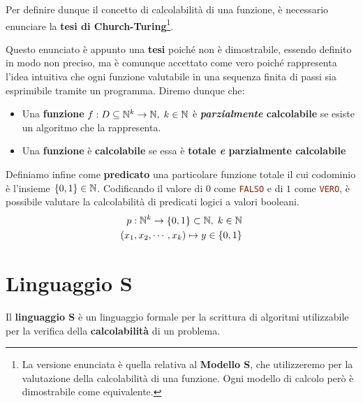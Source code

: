Per definire dunque il concetto di calcolabilità di una funzione, è necessario enunciare la \textbf{tesi di Church-Turing}\footnote{La versione enunciata è quella relativa al \textbf{Modello S}, che utilizzeremo per la valutazione della calcolabilità di una funzione. Ogni modello di calcolo però è dimostrabile come equivalente.}.

Questo enunciato è appunto una \textbf{tesi} poiché non è dimostrabile, essendo definito in modo non preciso, ma è comunque accettato come vero poiché rappresenta l'idea intuitiva che ogni funzione valutabile in una sequenza finita di passi sia esprimibile tramite un programma.
Diremo dunque che:

\begin{itemize}
  \item Una \textbf{funzione} \(f: D\subseteq\mathbb{N}^k\rightarrow\mathbb{N},\; k\in\mathbb{N}\) è \textbf{\textit{parzialmente} calcolabile} se esiste un algoritmo che la rappresenta.
  \item Una \textbf{funzione} è \textbf{calcolabile} se essa è \textbf{totale \textit{e} parzialmente calcolabile}
\end{itemize}

Definiamo infine come \textbf{predicato} una particolare funzione totale il cui codominio è l'insieme \(\displaystyle{\left\{{0,1}\right\}}\in\mathbb{N}\). Codificando il valore di \(0\) come \lstinline[language=ini]{FALSO} e di \(1\) come \lstinline[language=ini]{VERO}, è possibile valutare la calcolabilità di predicati logici a valori booleani.
\begin{equation}
  \begin{split}
    p: \mathbb{N}^k\rightarrow\displaystyle{\left\{{0,1}\right\}}\subset\mathbb{N},\; k\in\mathbb{N}\\
    (x_1,x_2,\cdots,x_k)\mapsto y\in\displaystyle{\left\{{0,1}\right\}}
    \end{split}
    \label{Predicato Eq}
\end{equation}

\newpage

\section{Linguaggio S}

Il \textbf{linguaggio S} è un linguaggio formale per la scrittura di algoritmi utilizzabile per la verifica della \textbf{calcolabilità} di un problema.

